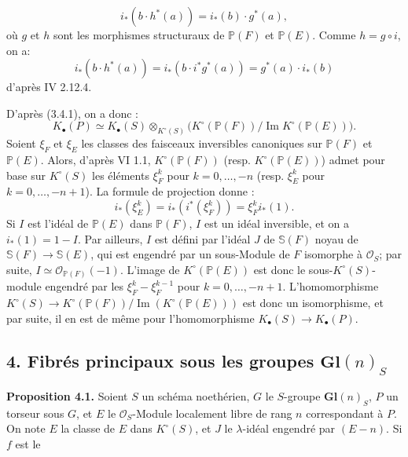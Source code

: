 \[
i_*(b\cdot h^*(a))=i_*(b)\cdot g^*(a),
\]
où $g$ et $h$
sont les morphismes structuraux de $\mathbb P(F)$ et $\mathbb P(E)$. Comme $h=g\circ i$, on a:
\[
i_*(b\cdot h^*(a))=i_*(b\cdot i^*g^*(a))=g^*(a)\cdot i_*(b)
\]
d'après IV 2.12.4.

D'après (3.4.1), on a donc :
\[
K_\bullet(P)\simeq K_\bullet(S)\otimes_{K^\circ(S)}
\bigl(K^\circ(\mathbb P(F))/\operatorname{Im}K^\circ(\mathbb P(E))\bigr).
\]
Soient $\xi_F$ et $\xi_E$ les classes des faisceaux inversibles canoniques sur $\mathbb P(F)$ et $\mathbb P(E)$. Alors, d'après VI 1.1, $K^\circ(\mathbb P(F))$ (resp. $K^\circ(\mathbb P(E))$) admet pour base sur $K^\circ(S)$ les éléments $\xi_F^k$ pour $k=0,\ldots,-n$ (resp. $\xi_E^k$ pour $k=0,\ldots,-n+1$). La formule de projection donne :
\[
i_*(\xi_E^k)=i_*(i^*(\xi_F^k))=\xi_F^k i_*(1).
\]
Si $I$ est l'idéal de $\mathbb P(E)$ dans $\mathbb P(F)$, $I$ est un idéal inversible, et on a $i_*(1)=1-I$. Par ailleurs, $I$ est défini par l'idéal $J$ de $\mathbb S(F)$ noyau de $\mathbb S(F)\to \mathbb S(E)$, qui est engendré par un sous-Module de $F$ isomorphe à $\mathcal O_S$; par suite, $I\simeq \mathcal O_{\mathbb P(F)}(-1)$. L'image de $K^\circ(\mathbb P(E))$ est donc le sous-$K^\circ(S)$-module engendré par les $\xi_F^k-\xi_F^{k-1}$ pour $k=0,\ldots,-n+1$. L'homomorphisme $K^\circ(S)\longrightarrow K^\circ(\mathbb P(F))/\operatorname{Im}(K^\circ(\mathbb P(E)))$ est donc un isomorphisme, et par suite, il en est de même pour l'homomorphisme $K_\bullet(S)\to K_\bullet(P)$.

\subsection*{4. Fibrés principaux sous les groupes $\mathbf{Gl}(n)_S$}

\textbf{Proposition 4.1.} Soient $S$ un schéma noethérien, $G$ le $S$-groupe $\mathbf{Gl}(n)_S$, $P$ un torseur sous $G$, et $E$ le $\mathcal O_S$-Module localement libre de rang $n$ correspondant à $P$. On note $E$ la classe de $E$ dans $K^\circ(S)$, et $J$ le $\lambda$-idéal engendré par $(E-n)$. Si $f$ est le
